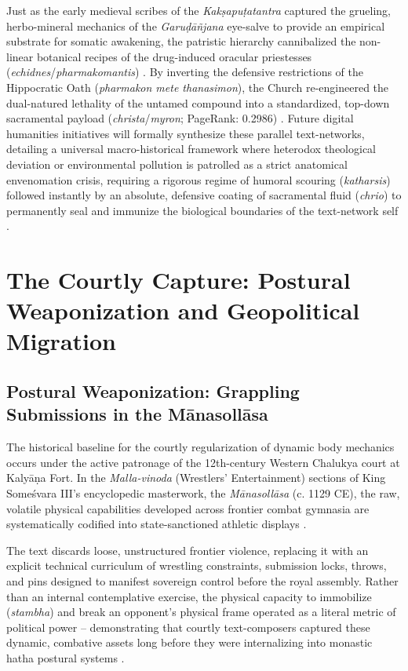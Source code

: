 \documentclass[11pt,twoside,letterpaper]{article}
\begin{document}
Just as the early medieval scribes of the \textit{Kakṣapuṭatantra} captured the grueling, herbo-mineral mechanics of the \textit{Garuḍāñjana} eye-salve to provide an empirical substrate for somatic awakening, the patristic hierarchy cannibalized the non-linear botanical recipes of the drug-induced oracular priestesses (\textit{echidnes}/\textit{pharmakomantis}) \citep{Wujastyk2025, McCartneyForthcomingDomingD}. By inverting the defensive restrictions of the Hippocratic Oath (\textit{pharmakon mete thanasimon}), the Church re-engineered the dual-natured lethality of the untamed compound into a standardized, top-down sacramental payload (\textit{christa}/\textit{myron}; PageRank: 0.2986) \citep{McCartneyForthcomingDomingD}. Future digital humanities initiatives will formally synthesize these parallel text-networks, detailing a universal macro-historical framework where heterodox theological deviation or environmental pollution is patrolled as a strict anatomical envenomation crisis, requiring a rigorous regime of humoral scouring (\textit{katharsis}) followed instantly by an absolute, defensive coating of sacramental fluid (\textit{chrio}) to permanently seal and immunize the biological boundaries of the text-network self \citep{McCartneyForthcomingDomingD}.

\section{The Courtly Capture: Postural Weaponization and Geopolitical Migration}

\subsection{Postural Weaponization: Grappling Submissions in the Mānasollāsa}
The historical baseline for the courtly regularization of dynamic body mechanics occurs under the active patronage of the 12th-century Western Chalukya court at Kalyāṇa Fort. In the \textit{Malla-vinoda} (Wrestlers’ Entertainment) sections of King Someśvara III’s encyclopedic masterwork, the \textit{Mānasollāsa} (c. 1129 CE), the raw, volatile physical capabilities developed across frontier combat gymnasia are systematically codified into state-sanctioned athletic displays \citep{Manasollasa2}. 

The text discards loose, unstructured frontier violence, replacing it with an explicit technical curriculum of wrestling constraints, submission locks, throws, and pins designed to manifest sovereign control before the royal assembly. Rather than an internal contemplative exercise, the physical capacity to immobilize (\textit{stambha}) and break an opponent’s physical frame operated as a literal metric of political power – demonstrating that courtly text-composers captured these dynamic, combative assets long before they were internalizing into monastic hatha postural systems \citep{OHanlon2007}.
\end{document}

